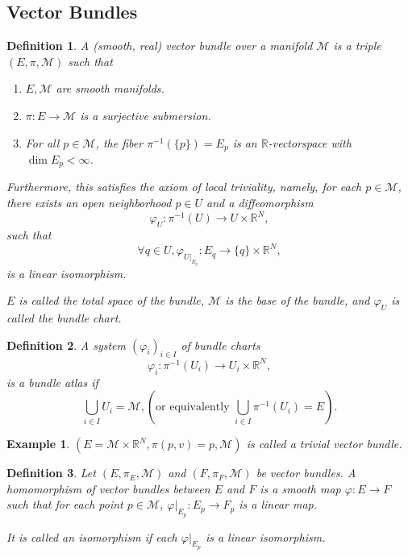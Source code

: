 \documentclass[8pt]{article}
\newtheorem{definition}{Definition}[section]
\newtheorem{example}{Example}[section]
\newcommand{\R}[0]{\mathbb{R}}
\newcommand{\M}[0]{\mathcal{M}}
\begin{document}
\subsection{Vector Bundles}
\begin{definition}
  A (smooth, real) vector bundle over a manifold $\M$ is a triple $(E,\pi,\M)$ such that 
  \begin{enumerate}[1).]
    \item $E,\M$ are smooth manifolds. 
    \item $\pi:E\to \M$ is a surjective submersion.
    \item For all $p\in\M$, the fiber $\pi^{-1}(\{p\}) = E_p$ is an $\R$-vectorspace with $\dim E_p<\infty$.
  \end{enumerate}
  Furthermore, this satisfies the axiom of local triviality, namely, for each $p\in\M$, there exists an open neighborhood $p\in U$ and a diffeomorphism 
  \begin{equation*}
    \varphi_U:\pi^{-1}(U)\to U\times \R^N,
  \end{equation*}
  such that 
  \begin{equation*}
    \forall q\in U, \varphi_{U|_{E_q}}:E_q\to\{q\}\times \R^N,
  \end{equation*}
  is a linear isomorphism.
  \par $E$ is called the total space of the bundle, $\M$ is the base of the bundle, and $\varphi_U$ is called the bundle chart.
\end{definition}
\begin{definition}
  A system $(\varphi_i)_{i\in I}$ of bundle charts 
  \begin{equation*}
    \varphi_i:\pi^{-1}(U_i)\to U_i\times \R^N,
  \end{equation*}
  is a bundle atlas if 
  \begin{equation*}
    \bigcup_{i\in I}U_i = \M, \left(\text{or equivalently } \bigcup_{i\in I}\pi^{-1}(U_i)=E\right).
  \end{equation*}
\end{definition}

\begin{example}
  $(E=\M\times\R^N,\pi(p,v) = p,\M)$ is called a trivial vector bundle.
\end{example}

\begin{definition}
  Let $(E,\pi_E,\M)$ and $(F,\pi_F,\M)$ be vector bundles. A homomorphism of vector bundles between $E$ and $F$ is a smooth map 
  $\varphi:E\to F$ such that for each point $p\in\M$, $\varphi|_{E_p}:E_p\to F_p$ is a linear map.
  \par It is called an isomorphism if each $\varphi|_{E_p}$ is a linear isomorphism.
\end{definition}
\end{document}
